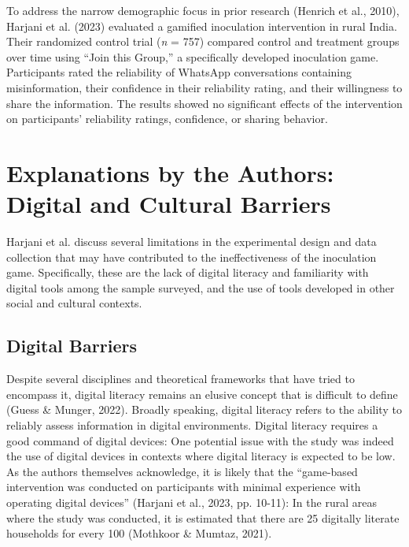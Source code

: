 \documentclass[authordate, empirical]{jote-new-article}
\begin{document}
	To address the narrow demographic focus in prior research (Henrich et al., 2010), Harjani et al. (2023) evaluated a gamified inoculation intervention in rural India. Their randomized control trial (\emph{n} = 757) compared control and treatment groups over time using “Join this Group,” a specifically developed inoculation game. Participants rated the reliability of WhatsApp conversations containing misinformation, their confidence in their reliability rating, and their willingness to share the information. The results showed no significant effects of the intervention on participants' reliability ratings, confidence, or sharing behavior.



	\section{Explanations by the Authors: Digital and Cultural Barriers}



	Harjani et al. discuss several limitations in the experimental design and data collection that may have contributed to the ineffectiveness of the inoculation game. Specifically, these are the lack of digital literacy and familiarity with digital tools among the sample surveyed, and the use of tools developed in other social and cultural contexts.



	\subsection{Digital Barriers}



	Despite several disciplines and theoretical frameworks that have tried to encompass it, digital literacy remains an elusive concept that is difficult to define (Guess \& Munger, 2022). Broadly speaking, digital literacy refers to the ability to reliably assess information in digital environments. Digital literacy requires a good command of digital devices: One potential issue with the study was indeed the use of digital devices in contexts where digital literacy is expected to be low. As the authors themselves acknowledge, it is likely that the “game-based intervention was conducted on participants with minimal experience with operating digital devices” (Harjani et al., 2023, pp. 10-11): In the rural areas where the study was conducted, it is estimated that there are 25 digitally literate households for every 100 (Mothkoor \& Mumtaz, 2021).
\end{document}
